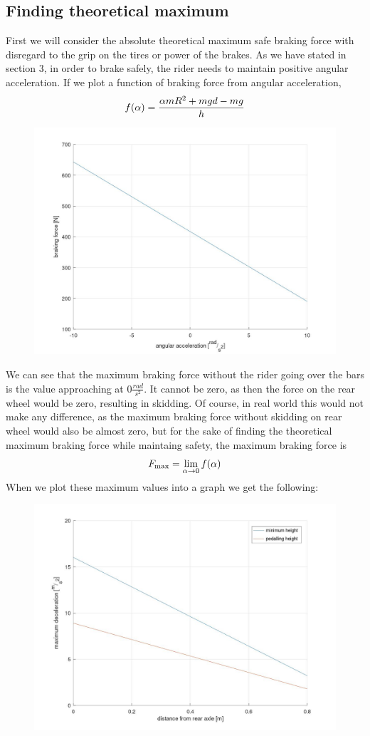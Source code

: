 \documentclass[12pt, a4]{article}
\begin{document}
\subsection{Finding theoretical maximum}\label{effective_braking_theoretical_max}
First we will consider the absolute theoretical maximum safe braking force with disregard to the grip on the tires or power of the 
brakes. As we have stated in section 3, in order to brake safely, the rider needs to maintain positive angular
acceleration. If we plot a function of braking force from angular acceleration,
\begin{equation}
\centering%
\label{eq:force_from_angular_acceleration}
f(\alpha) = \frac{\alpha mR^2 + mgd - mg}{h}
\end{equation}
\begin{figure}[H]
\caption{}
\centering%
\label{fig:braking_force_graph}
\includegraphics[width=0.7\linewidth]{force_from_angular_acceleration}%
\end{figure}
We can see that the maximum braking force without the rider going over the bars is the value approaching at $0\frac{rad}{s^2}$. It
cannot be zero, as then the force on the rear wheel would be zero, resulting in skidding. Of course, in real world this would not 
make any difference, as the maximum braking force without skidding on rear wheel would also be almost zero, but for the sake of 
finding the theoretical maximum braking force while maintaing safety, the maximum braking force is
\begin{equation}
\centering%
\label{eq:force_from_angular_acceleration}
F_{\max} = \lim_{\alpha\to 0} f(\alpha)
\end{equation}
When we plot these maximum values into a graph we get the following:
\begin{figure}[H]
\caption{}
\centering%
\label{fig:maximum_theoretical_deceleration}
\includegraphics[width=0.7\linewidth]{maximum_theoretical_deceleration}%
\end{figure}
\end{document}
